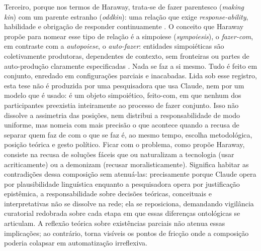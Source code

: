 Terceiro, porque nos termos de Haraway, trata-se de fazer parentesco (\textit{making kin}) com um parente estranho (\textit{oddkin}): uma relação que exige \textit{response-ability}, habilidade e obrigação de responder continuamente \parencite{Haraway2016Staying}. O conceito que Haraway propõe para nomear esse tipo de relação é a simpoiese (\textit{sympoiesis}), o \textit{fazer-com}, em contraste com a \textit{autopoiese}, o \textit{auto-fazer}: entidades simpoiéticas são coletivamente produtoras, dependentes de contexto, sem fronteiras ou partes de auto-produção claramente especificadas \parencite{Haraway2016Staying}. Nada se faz a si mesmo. Tudo é feito em conjunto, enredado em configurações parciais e inacabadas. Lida sob esse registro, esta tese não é produzida por uma pesquisadora que usa Claude, nem por um modelo que é usado: é um objeto simpoiético, feito-com, em que nenhum dos participantes preexistia inteiramente ao processo de fazer conjunto. Isso não dissolve a assimetria das posições, nem distribui a responsabilidade de modo uniforme, mas nomeia com mais precisão o que acontece quando a recusa de separar quem faz de com o que se faz é, ao mesmo tempo, escolha metodológica, posição teórica e gesto político. Ficar com o problema, como propõe Haraway, consiste na recusa de soluções fáceis que ou naturalizam a tecnologia (usar acriticamente) ou a demonizam (recusar moralisticamente). Significa habitar as contradições dessa composição sem atenuá-las: precisamente porque Claude opera por plausibilidade linguística enquanto a pesquisadora opera por justificação epistêmica, a responsabilidade sobre decisões teóricas, conceituais e interpretativas não se dissolve na rede; ela se reposiciona, demandando vigilância curatorial redobrada sobre cada etapa em que essas diferenças ontológicas se articulam. A reflexão teórica sobre existências parciais não atenua essas implicações; ao contrário, torna visíveis os pontos de fricção onde a composição poderia colapsar em automatização irreflexiva.

%
%


